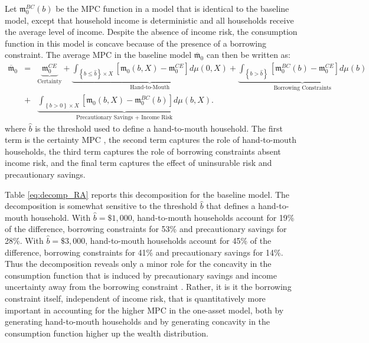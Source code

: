 Let $\mathfrak{m}_{0}^{BC}\left( b\right) $ be the MPC function in a model that is identical to the baseline model, except that household income is deterministic and all households receive the average level of income. Despite the absence of income risk, the consumption function in this model is concave because of the presence of a borrowing constraint. The average MPC in the baseline model $\overline{\mathfrak{m}}_{0}$ can then be written as: 
\begin{eqnarray*}
\overline{\mathfrak{m}}_{0} & =& \underset{\text{Certainty}}{\underbrace{\mathfrak{m}_{0}^{CE}}}+\underset{\text{Hand-to-Mouth}}{\underbrace{\int_{\left\{ b\leq\hat{b}\right\} \times X}\left[ \mathfrak{m}_{0}\left(b,X\right) -\mathfrak{m}_{0}^{CE}\right] d\mu \left(0,X\right) }} + \underset{\text{Borrowing Constraints}}{\underbrace{\int_{\left\{ b>\hat{b}\right\} }\left[ \mathfrak{m}_{0}^{BC}\left( b\right) -\mathfrak{m}_{0}^{CE}\right] d\mu \left(b\right) }}  \\
& + &\underset{\text{Precautionary Savings + Income Risk}}{\underbrace{\int_{\left\{ b>0
\right\} \times X}\left[ \mathfrak{m}_{0}\left( b,X\right) -\mathfrak{m}%
_{0}^{BC}\left( b\right) \right] d\mu \left( b,X\right) }}.  \label{eq:decomp_RA}
\end{eqnarray*}
where $\hat{b}$ is the threshold used to define a hand-to-mouth household. The first term is the certainty MPC , the second term captures the role of hand-to-mouth households, the third term captures the role of borrowing constraints absent income risk, and the final term captures the effect of uninsurable risk and precautionary savings.

Table \eqref{eq:decomp_RA} reports this decomposition for the baseline model. The decomposition is somewhat sensitive to the threshold $\hat{b}$ that defines a hand-to-mouth household. With $\hat{b} = \$1,000$, hand-to-mouth households account for 19\% of the difference, borrowing constraints for 53\% and precautionary savings for 28\%. With $\hat{b} = \$3,000$, hand-to-mouth households account for 45\% of the difference, borrowing constraints for 41\% and precautionary savings for 14\%. Thus the decomposition reveals only a minor role for the concavity in the consumption function that is induced by precautionary savings and income uncertainty away from the borrowing constraint . Rather, it is it the borrowing constraint itself, independent of income risk, that is quantitatively more important in accounting for the higher MPC in the one-asset model, both by generating hand-to-mouth households and by generating concavity in the consumption function higher up the wealth distribution. 


